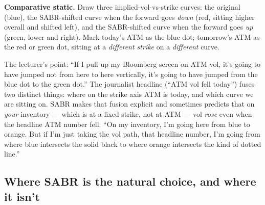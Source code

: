 \begin{keyblock}
\textbf{Comparative static.} Draw three implied-vol-vs-strike
curves: the original (blue), the SABR-shifted curve when the
forward goes \emph{down} (red, sitting higher overall and shifted
left), and the SABR-shifted curve when the forward goes \emph{up}
(green, lower and right). Mark today's ATM as the blue dot;
tomorrow's ATM as the red or green dot, sitting at a \emph{different
strike} on a \emph{different} curve.

\begin{center}
\end{center}
\end{keyblock}

The lecturer's point: ``If I pull up my Bloomberg screen on ATM vol,
it's going to have jumped not from here to here vertically, it's
going to have jumped from the blue dot to the green dot.'' The
journalist headline (``ATM vol fell today'') fuses two distinct
things: where on the strike axis ATM is today, and which curve we
are sitting on. SABR makes that fusion explicit and sometimes
predicts that on \emph{your} inventory --- which is at a fixed strike,
not at ATM --- vol \emph{rose} even when the headline ATM number
fell. ``On my inventory, I'm going here from blue to orange. But if
I'm just taking the vol path, that headline number, I'm going from
where blue intersects the solid black to where orange intersects the
kind of dotted line.''

\subsection{Where SABR is the natural choice, and where it isn't}\label{L8-sec:whererates}

